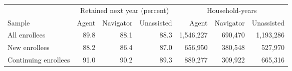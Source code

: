 
\begin{tabular}{lrrrrrr}
\toprule
\multicolumn{1}{c}{ } & \multicolumn{3}{c}{Retained next year (percent)} & \multicolumn{3}{c}{Household-years} \\
\cmidrule(l{3pt}r{3pt}){2-4} \cmidrule(l{3pt}r{3pt}){5-7}
Sample & Agent & Navigator & Unassisted & Agent & Navigator & Unassisted\\
\midrule
All enrollees & 89.8 & 88.1 & 88.3 & 1,546,227 & 690,470 & 1,193,286\\
New enrollees & 88.2 & 86.4 & 87.0 & 656,950 & 380,548 & 527,970\\
Continuing enrollees & 91.0 & 90.2 & 89.3 & 889,277 & 309,922 & 665,316\\
\bottomrule
\end{tabular}
